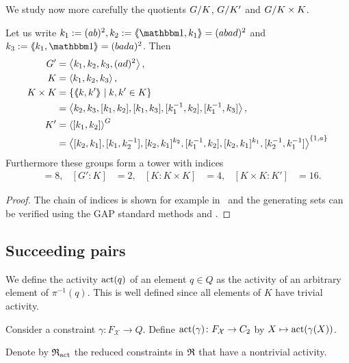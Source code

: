 \documentclass[a4paper,11pt]{amsart}
\begin{document}
We study now more carefully the quotients ${G/K}$, ${G/K'}$
and ${G/K\times K}$.
\begin{lem} \label{lem:subgroupsOfG}
Let us write $k_1 := (ab)^2, k_2:=\pair{\id,k_1} = (abad)^2$ and $k_3:=\pair{k_1,\id} = (bada)^2$. Then 
 \begin{align*}
  G' &= \left< k_1,k_2,k_3,(ad)^2\right>, \\
  K &= \left< k_1,k_2,k_3\right>, \\
  K\times K &= \{\langle\negthickspace\langle k,k'\rangle\negthickspace\rangle \mid k,k'\in K\} \\&= \left< k_2,k_3,[k_1,k_2],[k_1,k_3],[k_1^{-1},k_2],[k_1^{-1},k_3] \right>,\\
  K' &= \left< [k_1,k_2] \right>^G \\ 
  &= \left<[k_2,k_1],[k_1,k_2^{-1}],[k_2,k_1]^{k_2},[k_1^{-1},k_2], [k_2,k_1]^{k_1},[k_2^{-1},k_1^{-1}]\right>^{\{1,a\}} 
 \end{align*}
Furthermore these groups form a tower with indices
\begin{align*}
  [G:G']&=8, & [G':K]&=2, &[K:K\times K]&= 4, &[K\times K:K']&=16. 
\end{align*}
\end{lem}
\begin{proof}
 The chain of indices is shown for example in~\cite{Bartholdi-Grigorchuk-Sunik:BranchGroups} 
 and the generating sets can be verified using the GAP standard methods
  and . 
\end{proof}

\subsection{Succeeding pairs}
\begin{defi}
  We define the activity $\operatorname{act}(q)$ of an element $q\in Q$ as the
  activity of an arbitrary element of $\pi^{-1}(q)$.  This is well
  defined since all elements of $K$ have trivial activity.
 
  Consider a constraint $\gamma\colon F_{\mathcal{X}} \to Q$.  Define
  $\operatorname{act}(\gamma)\colon F_{\mathcal{X}}\to C_2$ by
  $X \mapsto \operatorname{act}(\gamma(X))$.
 
  Denote by $\mathfrak{R}_{\operatorname{act}}$ the reduced constraints in $\mathfrak{R}$ that have a
  nontrivial activity.
\end{defi}
\end{document}
